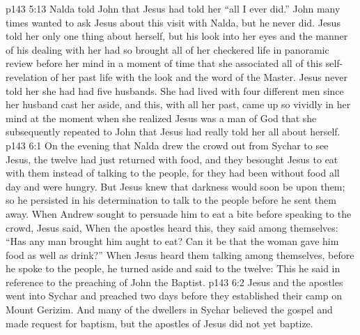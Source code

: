 \vs p143 5:13 Nalda told John that Jesus had told her “all I ever did.” John many times wanted to ask Jesus about this visit with Nalda, but he never did. Jesus told her only one thing about herself, but his look into her eyes and the manner of his dealing with her had so brought all of her checkered life in panoramic review before her mind in a moment of time that she associated all of this self\hyp{}revelation of her past life with the look and the word of the Master. Jesus never told her she had had five husbands. She had lived with four different men since her husband cast her aside, and this, with all her past, came up so vividly in her mind at the moment when she realized Jesus was a man of God that she subsequently repeated to John that Jesus had really told her all about herself.
\vs p143 6:1 On the evening that Nalda drew the crowd out from Sychar to see Jesus, the twelve had just returned with food, and they besought Jesus to eat with them instead of talking to the people, for they had been without food all day and were hungry. But Jesus knew that darkness would soon be upon them; so he persisted in his determination to talk to the people before he sent them away. When Andrew sought to persuade him to eat a bite before speaking to the crowd, Jesus said,  When the apostles heard this, they said among themselves: “Has any man brought him aught to eat? Can it be that the woman gave him food as well as drink?” When Jesus heard them talking among themselves, before he spoke to the people, he turned aside and said to the twelve:  This he said in reference to the preaching of John the Baptist.
\vs p143 6:2 Jesus and the apostles went into Sychar and preached two days before they established their camp on Mount Gerizim. And many of the dwellers in Sychar believed the gospel and made request for baptism, but the apostles of Jesus did not yet baptize.
